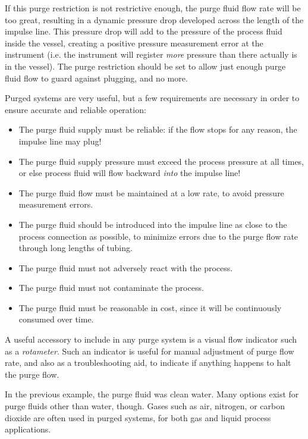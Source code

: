If this purge restriction is not restrictive enough, the purge fluid flow rate will be too great, resulting in a dynamic pressure drop developed across the length of the impulse line.  This pressure drop will add to the pressure of the process fluid inside the vessel, creating a positive pressure measurement error at the instrument (i.e. the instrument will register \textit{more} pressure than there actually is in the vessel).  The purge restriction should be set to allow just enough purge fluid flow to guard against plugging, and no more.

Purged systems are very useful, but a few requirements are necessary in order to ensure accurate and reliable operation:  

\begin{itemize}
\item The purge fluid supply must be reliable: if the flow stops for any reason, the impulse line may plug!
\item The purge fluid supply pressure must exceed the process pressure at all times, or else process fluid will flow backward \textit{into} the impulse line!
\item The purge fluid flow must be maintained at a low rate, to avoid pressure measurement errors.
\item The purge fluid should be introduced into the impulse line as close to the process connection as possible, to minimize errors due to the purge flow rate through long lengths of tubing.
\item The purge fluid must not adversely react with the process.
\item The purge fluid must not contaminate the process.
\item The purge fluid must be reasonable in cost, since it will be continuously consumed over time.
\end{itemize}

A useful accessory to include in any purge system is a visual flow indicator such as a \textit{rotameter}.  Such an indicator is useful for manual adjustment of purge flow rate, and also as a troubleshooting aid, to indicate if anything happens to halt the purge flow.   

In the previous example, the purge fluid was clean water.  Many options exist for purge fluids other than water, though.  Gases such as air, nitrogen, or carbon dioxide are often used in purged systems, for both gas and liquid process applications.  

